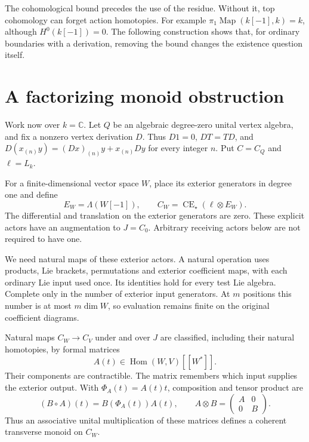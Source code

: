 The cohomological bound precedes the use of the residue.
Without it, top cohomology can forget action homotopies.
For example $\pi_1\operatorname{Map}(k[-1],k)=k$,
although $H^0(k[-1])=0$. The following construction
shows that, for ordinary boundaries with a derivation,
removing the bound changes the existence question itself.

\section{A factorizing monoid obstruction}

Work now over $k=\mathbb C$. Let $Q$ be an algebraic
degree-zero unital vertex algebra, and fix a nonzero
vertex derivation $D$. Thus $D1=0$, $DT=TD$, and
$D(x_{(n)}y)=(Dx)_{(n)}y+x_{(n)}Dy$ for every integer
$n$. Put $C=C_Q$ and $\ell=L_k$.

For a finite-dimensional vector space $W$, place its
exterior generators in degree one and define
\[
 E_W=\Lambda(W[-1]),\qquad
 C_W=\operatorname{CE}_\star(\ell\otimes E_W).
\]
The differential and translation on the exterior
generators are zero. These explicit actors have an
augmentation to $J=C_0$. Arbitrary receiving actors below
are not required to have one.

We need natural maps of these exterior actors. A natural
operation uses products, Lie brackets, permutations and
exterior coefficient maps, with each ordinary Lie input
used once. Its identities hold for every test Lie
algebra. Complete only in the number of exterior input
generators. At $m$ positions this number is at most
$m\dim W$, so evaluation remains finite on the original
coefficient diagrams.

\begin{lemma}\label{mht:lem:marked-actor-maps}
Natural maps $C_W\to C_V$ under and over $J$ are
classified, including their natural homotopies, by
formal matrices
\[
 A(t)\in\operatorname{Hom}(W,V)[[W^*]].
\]
Their components are contractible. The matrix remembers
which input supplies the exterior output. With
$\Phi_A(t)=A(t)t$, composition and tensor product are
\[
 (B\circ A)(t)=B(\Phi_A(t))A(t),\qquad
 A\otimes B=\begin{pmatrix}A&0\\0&B\end{pmatrix}.
\]
Thus an associative unital multiplication of these
matrices defines a coherent transverse monoid on $C_W$.
\end{lemma}

